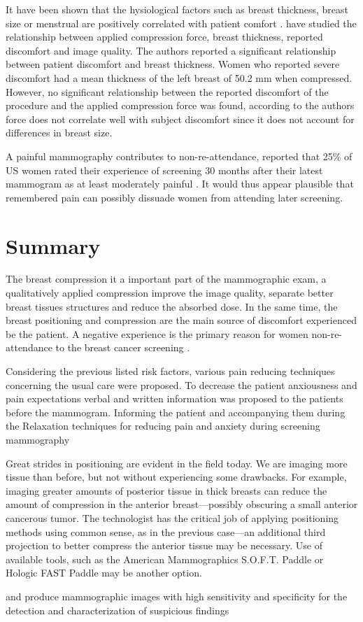 It have been shown that the hysiological factors such as breast thickness, breast size or menstrual are positively correlated with patient comfort \citep{keemers_pain_2000,hafslund_mammography_2000}. \citep{poulos_breast_2003} have studied the relationship between applied compression force, breast thickness, reported discomfort and image quality. The authors reported  a significant relationship  between patient  discomfort and breast thickness. Women who reported severe discomfort had a mean thickness of the left breast of 50.2 mm when compressed. However,  no significant relationship between the reported discomfort of the procedure and the applied compression force was found, according to the authors  force does not correlate well with subject discomfort since it does not account for differences in breast size.
 
 
A painful mammography contributes to non-re-attendance, \cite{peipins_impact_2006} reported that 25\% of US women rated their experience of screening 30
months after their latest mammogram as at least moderately painful . It would
thus appear plausible that remembered pain can possibly dissuade women from
attending later screening.

\section{Summary}\label{section:compression:conclusion}

The breast compression it a important part of the mammographic exam, a qualitatively applied compression improve the image quality, separate better breast tissues structures and reduce the absorbed dose. In the same time, the breast positioning and compression are the main source of discomfort experienced be the patient. A negative experience is the primary reason for women non-re-attendance to the breast cancer screening .

Considering the previous listed risk factors, various pain reducing techniques concerning the usual care were proposed. To decrease the patient anxiousness and pain expectations verbal and written information was proposed to the patients before the mammogram. Informing the patient and  accompanying them during the  
Relaxation techniques for reducing pain and anxiety during screening mammography


Great strides in positioning are evident in the field today. We are imaging more tissue than before, but not without experiencing some drawbacks. For example, imaging greater amounts of posterior tissue in thick breasts can reduce the amount of compression in the anterior breast—possibly obscuring a small anterior cancerous tumor. The technologist has the critical job of applying positioning methods using
common sense, as in the previous case—an additional third projection to better compress the anterior tissue may be necessary. Use of available tools, such as the American Mammographics S.O.F.T. Paddle or Hologic FAST Paddle may be another option.



 and produce mammographic images with high sensitivity and specificity for the detection and characterization of suspicious findings